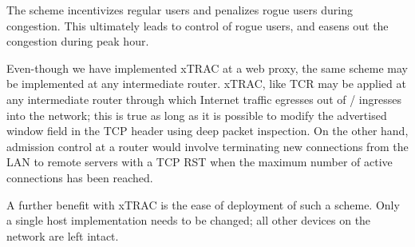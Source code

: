 \documentclass[conference]{../../IEEEtran}
\begin{document}
The scheme incentivizes regular users and penalizes rogue users during congestion. This ultimately leads to control of rogue users, and easens out the congestion during peak hour. 

Even-though we have implemented xTRAC at a web proxy, the same scheme may be implemented at any intermediate router. xTRAC, like TCR may be applied at any intermediate router through which Internet traffic egresses out of / ingresses into the network; this is true as long as it is possible to modify the advertised window field in the TCP header using deep packet inspection. On the other hand, admission control at a router would involve terminating new connections from the LAN to remote servers with a TCP RST when the maximum number of active connections has been reached. 

A further benefit with xTRAC is the ease of deployment of such a scheme. Only a single host implementation needs to be changed; all other devices on the network are left intact.












%
%
%




 


\end{document}

